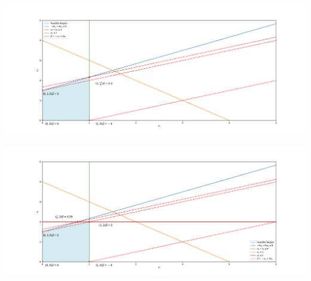 \begin{center}
    \includegraphics[width = \textwidth]{Exercice/PY/EX2/ex2.2.pdf}
\end{center}


\begin{center}
    \includegraphics[width = \textwidth]{Exercice/PY/EX2/ex2.3.pdf}
\end{center}

